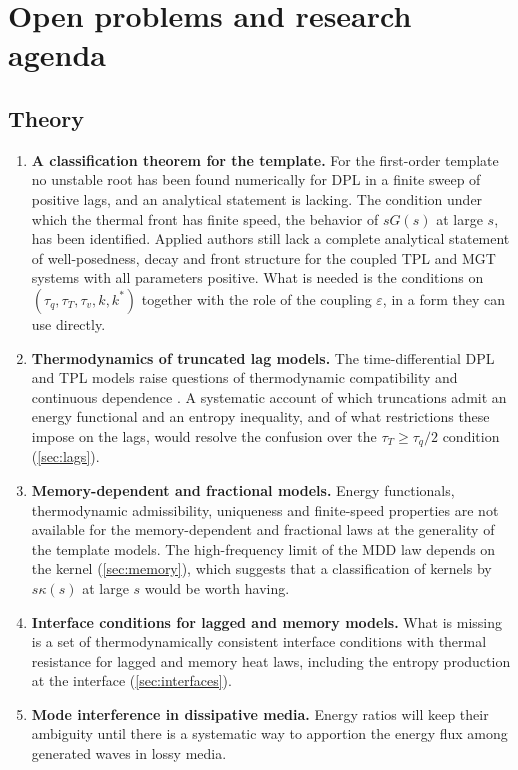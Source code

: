 \section{Open problems and research agenda}\label{sec:open}
\subsection{Theory}
\begin{enumerate}
\item \textbf{A classification theorem for the template.} For the first-order template no unstable root has been found numerically for DPL in a finite sweep of positive lags, and an analytical statement is lacking. The condition under which the thermal front has finite speed, the behavior of $sG(s)$ at large $s$, has been identified. Applied authors still lack a complete analytical statement of well-posedness, decay and front structure for the coupled TPL and MGT systems with all parameters positive. What is needed is the conditions on $(\tau_q,\tau_T,\tau_v,k,k^*)$ together with the role of the coupling $\varepsilon$, in a form they can use directly.
\item \textbf{Thermodynamics of truncated lag models.} The time-differential DPL and TPL models raise questions of thermodynamic compatibility and continuous dependence \citep{Chirita2016,Tibullo2017}. A systematic account of which truncations admit an energy functional and an entropy inequality, and of what restrictions these impose on the lags, would resolve the confusion over the $\tau_T\ge\tau_q/2$ condition (\cref{sec:lags}).
\item \textbf{Memory-dependent and fractional models.} Energy functionals, thermodynamic admissibility, uniqueness and finite-speed properties are not available for the memory-dependent and fractional laws at the generality of the template models. The high-frequency limit of the MDD law depends on the kernel (\cref{sec:memory}), which suggests that a classification of kernels by $s\kappa(s)$ at large $s$ would be worth having.
\item \textbf{Interface conditions for lagged and memory models.} What is missing is a set of thermodynamically consistent interface conditions with thermal resistance for lagged and memory heat laws, including the entropy production at the interface (\cref{sec:interfaces}).
\item \textbf{Mode interference in dissipative media.} Energy ratios will keep their ambiguity until there is a systematic way to apportion the energy flux among generated waves in lossy media.
\end{enumerate}
